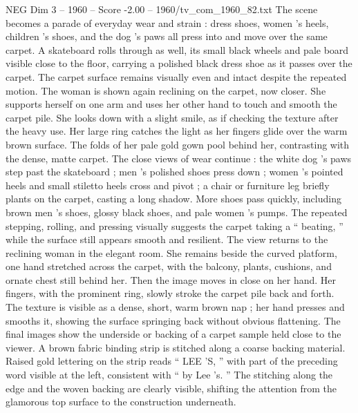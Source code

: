 \begin{textsample}{NEG Dim 3 – 1960 – Score -2.00 – 1960/tv\_com\_1960\_82.txt}
The scene becomes a parade of everyday wear and strain : dress shoes, women ’s heels, children ’s shoes, and the dog ’s paws all press into and move over the same carpet.
A skateboard rolls through as well, its small black wheels and pale board visible close to the floor, carrying a polished black dress shoe as it passes over the carpet.
The carpet surface remains visually even and intact despite the repeated motion.
The woman is shown again reclining on the carpet, now closer.
She supports herself on one arm and uses her other hand to touch and smooth the carpet pile.
She looks down with a slight smile, as if checking the texture after the heavy use.
Her large ring catches the light as her fingers glide over the warm brown surface.
The folds of her pale gold gown pool behind her, contrasting with the dense, matte carpet.
The close views of wear continue : the white dog ’s paws step past the skateboard ; men ’s polished shoes press down ; women ’s pointed heels and small stiletto heels cross and pivot ; a chair or furniture leg briefly plants on the carpet, casting a long shadow.
More shoes pass quickly, including brown men ’s shoes, glossy black shoes, and pale women ’s pumps.
The repeated stepping, rolling, and pressing visually suggests the carpet taking a “ beating, ” while the surface still appears smooth and resilient.
The view returns to the reclining woman in the elegant room.
She remains beside the curved platform, one hand stretched across the carpet, with the balcony, plants, cushions, and ornate chest still behind her.
Then the image moves in close on her hand.
Her fingers, with the prominent ring, slowly stroke the carpet pile back and forth.
The texture is visible as a dense, short, warm brown nap ; her hand presses and smooths it, showing the surface springing back without obvious flattening.
The final images show the underside or backing of a carpet sample held close to the viewer.
A brown fabric binding strip is stitched along a coarse backing material.
Raised gold lettering on the strip reads “ LEE ’S, ” with part of the preceding word visible at the left, consistent with “ by Lee ’s. ” The stitching along the edge and the woven backing are clearly visible, shifting the attention from the glamorous top surface to the construction underneath.

\end{textsample}
